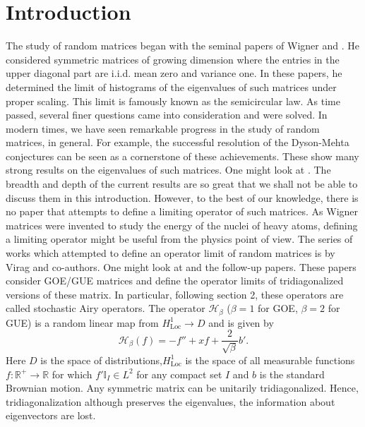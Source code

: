 \documentclass[reqno,12pt]{amsart}
\theoremstyle{plain}
\theoremstyle{definition}
\begin{document}
\section{Introduction}
The study of random matrices began with the seminal papers of Wigner \cite{wig1} and \cite{wig2}. He considered symmetric matrices of growing dimension where the entries in the upper diagonal part are i.i.d. mean zero and variance one. In these papers, he determined the limit of histograms of the eigenvalues of such matrices under proper scaling. This limit is famously known as the semicircular law. As time passed, several finer questions came into consideration and were solved. In modern times, we have seen remarkable progress in the study of random matrices, in general. For example, the successful resolution of the Dyson-Mehta conjectures can be seen as a cornerstone of these achievements. These show many strong results on the eigenvalues of such matrices. One might look at \cite{mehta2004random,erdHos2010bulk, MR2661171, MR2851058, erdHos2012local,erdHos2012bulk, erdHos2012rigidity}. The breadth and depth of the current results are so great that we shall not be able to discuss them in this introduction. However, to the best of our knowledge, there is no paper that attempts to define a limiting operator of such matrices. As Wigner matrices were invented to study the energy of the nuclei of heavy atoms, defining a limiting operator might be useful from the physics point of view. The series of works which attempted to define an operator limit of random matrices is by Virag and co-authors. One might look at \cite{ramirez2011beta} and the follow-up papers. These papers consider GOE/GUE matrices and define the operator limits of  tridiagonalized versions of these matrix. In particular, following \cite{ramirez2011beta} section 2, these operators are called stochastic Airy operators. The operator $\mathcal{H}_{\beta}$ ($\beta =1$ for GOE, $\beta =2$ for GUE) is a random linear map from $H^{1}_{\mathrm{Loc}} \to D$ and is given by 
\[
\mathcal{H}_{\beta}(f)= -f''+ xf + \frac{2}{\sqrt{\beta}} b'.
\]
Here $D$ is the space of distributions,$H^{1}_{\mathrm{Loc}}$ is the space of all measurable functions $f: \mathbb{R}^{+} \to \mathbb{R}$  for which $f'\mathbb{I}_{I} \in L^{2}$ for any compact set $I$ and $b$ is the standard Brownian motion. Any symmetric matrix can be unitarily tridiagonalized. Hence, tridiagonalization although preserves the eigenvalues, the information about eigenvectors are lost.
\end{document}
